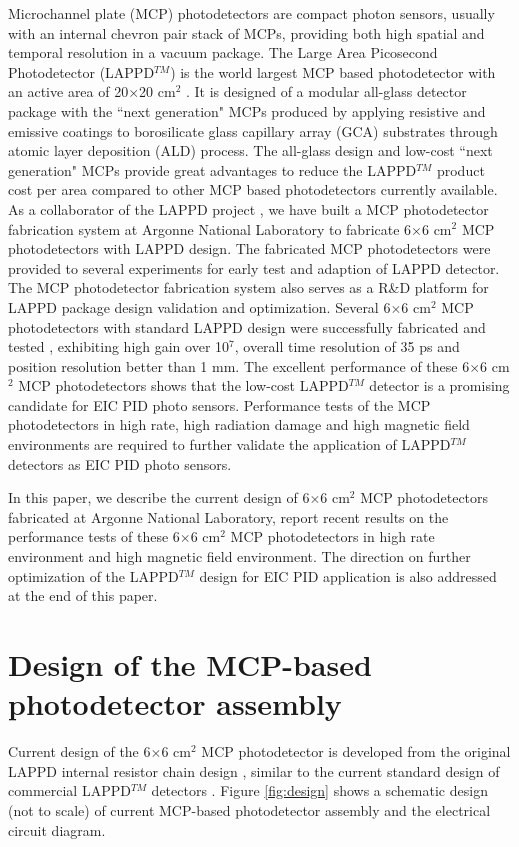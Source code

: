 \documentclass[preprint,5p]{elsarticle}
\begin{document}
Microchannel plate (MCP) photodetectors are compact photon sensors, usually 
with an internal chevron pair stack of MCPs, providing both high spatial and 
temporal resolution in a vacuum package. The Large Area Picosecond 
Photodetector (LAPPD$^{TM}$) is the world largest MCP based photodetector with 
an active area of 20$\times$20 cm$^2$ \cite{LAPPD}. It is designed of a modular 
all-glass detector package with the ``next generation" MCPs produced by 
applying resistive and emissive coatings to borosilicate glass capillary array 
(GCA) substrates through atomic layer deposition (ALD) process. The all-glass 
design and low-cost ``next generation" MCPs provide great advantages to reduce 
the LAPPD$^{TM}$ product cost per area compared to other MCP based 
photodetectors currently available. As a collaborator of the LAPPD project 
\cite{LAPPD2}, we have built a MCP photodetector fabrication system 
\cite{LAPPD-ANL} at Argonne National Laboratory to fabricate 6$\times$6 cm$^2$ 
MCP photodetectors with LAPPD design.  The fabricated MCP photodetectors were 
provided to several experiments for early test and adaption of LAPPD detector.  
The MCP photodetector fabrication system also serves as a R{\&}D platform for 
LAPPD package design validation and optimization. Several 6$\times$6 cm$^2$ MCP 
photodetectors with standard LAPPD design were successfully fabricated and 
tested \cite{ANL-MCPs,Wang-MCPs,Wang-MCPs2}, exhibiting high gain over 10$^7$, 
overall time resolution of 35 ps and position resolution better than 1 mm.  The 
excellent performance of these 6$\times$6 cm$^2$ MCP photodetectors shows that 
the low-cost LAPPD$^{TM}$ detector is a promising candidate for EIC PID photo 
sensors.  Performance tests of the MCP photodetectors in high rate, high 
radiation damage and high magnetic field environments are required to further 
validate the application of LAPPD$^{TM}$ detectors as EIC PID photo sensors. 

In this paper, we describe the current design of 6$\times$6 cm$^2$ MCP 
photodetectors fabricated at Argonne National Laboratory, report recent results 
on the performance tests of these 6$\times$6 cm$^2$ MCP photodetectors in high 
rate environment and high magnetic field environment. The direction on further 
optimization of the LAPPD$^{TM}$ design for EIC PID application is also 
addressed at the end of this paper.


\section{Design of the MCP-based photodetector assembly} \label{sec_design}
Current design of the 6$\times$6 cm$^2$ MCP photodetector is developed from the 
original LAPPD internal resistor chain design \cite{Wang-MCPs2}, similar to the 
current standard design of commercial LAPPD$^{TM}$ detectors 
\cite{Craven-MCPs}. Figure \ref{fig:design} shows a schematic design (not to 
scale) of current MCP-based photodetector assembly and the electrical circuit 
diagram.  
\end{document}
